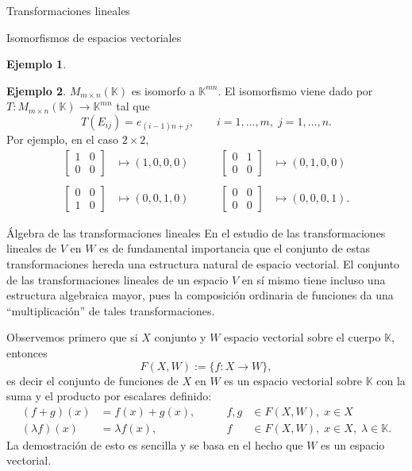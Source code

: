 \documentclass[a4paper,12pt,twoside,spanish,reqno]{amsbook}
\theoremstyle{definition}
\newtheorem{ejemplo}{Ejemplo}[section]
\theoremstyle{remark}
\newcommand{\K}{\mathbb K}
\begin{document}
\begin{chapter}{Transformaciones lineales}
\begin{section}{Isomorfismos de espacios vectoriales}
\begin{ejemplo}
	\end{ejemplo}

	\begin{ejemplo} $M_{m \times n}(\K)$  es isomorfo a $\K^{mn}$. El isomorfismo viene dado por $T: M_{m \times n}(\K) \to \K^{mn}$ tal que
		$$
		T(E_{ij}) = e_{(i-1)n+j}, \qquad i=1,\ldots, m,\; j=1,\ldots, n.
		$$
	Por  ejemplo, en el caso  $2 \times 2$,
	\begin{equation*}
	\begin{array}{llll}
	\begin{bmatrix} 1&0\\0&0\end{bmatrix} &\mapsto (1,0,0,0) \qquad&
	\begin{bmatrix} 0&1\\0&0\end{bmatrix} &\mapsto (0,1,0,0) \\
	&&&\\
	\begin{bmatrix} 0&0\\1&0\end{bmatrix} &\mapsto (0,0,1,0) &
	\begin{bmatrix} 0&0\\0&0\end{bmatrix} &\mapsto (0,0,0,1).
	\end{array}
	\end{equation*}	 
		
	\end{ejemplo}
	
		\end{section}
	
		\begin{section}{Álgebra de las transformaciones lineales}
			En el estudio de las transformaciones lineales de $V$ en $W$ es de fundamental importancia que el conjunto de estas transformaciones hereda una estructura natural de espacio vectorial. El conjunto de las transformaciones lineales de un espacio $V$ en sí mismo tiene incluso una estructura algebraica mayor, pues la composición ordinaria de funciones da una ``multiplicación'' de tales transformaciones. 
			
			
			Observemos primero que si $X$ conjunto y $W$ espacio vectorial sobre el cuerpo $\K$,  entonces
			$$
			F(X,W) := \{f:X\to W\},
			$$ 
			es decir el conjunto de funciones de $X$ en $W$ es un espacio vectorial sobre $\K$ con la suma y el producto por escalares definido:
			\begin{equation*}
			\begin{array}{rlcl}
			(f+g)(x) &= f(x)+ g(x),\qquad &f,g& \in F(X,W),\; x \in X\\
			(\lambda f)(x) &= \lambda f(x), & f& \in F(X,W),\; x \in X, \; \lambda \in \K.
			\end{array}
			\end{equation*}
			La demostración de esto es sencilla y se basa en el hecho que $W$  es un espacio vectorial. 
			

\end{section}
\end{chapter}
\end{document}
